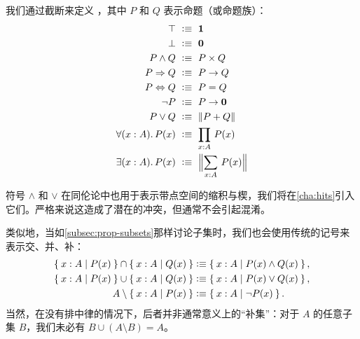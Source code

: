 \begin{defn} \label{defn:logical-notation}
  我们通过截断来定义
  ，其中 $P$ 和 $Q$ 表示命题（或命题族）：
  {\allowdisplaybreaks
  \begin{align*}
    \top            &\ \defeq \ \unit \\
    \bot            &\ \defeq \ \emptyt \\
    P \land Q       &\ \defeq \ P \times Q \\
    P \Rightarrow Q &\ \defeq \ P \to Q \\
    P \Leftrightarrow Q &\ \defeq \ P = Q \\
    \neg P          &\ \defeq \ P \to \emptyt \\
    P \lor Q        &\ \defeq \ \brck{P + Q} \\
    \fall{x : A} P(x) &\ \defeq \ \prd{x : A} P(x) \\
    \exis{x : A} P(x) &\ \defeq \ \Brck{\sm{x : A} P(x)}
  \end{align*}}
\end{defn}

符号 $\land$ 和 $\lor$ 在同伦论中也用于表示带点空间的缩积与楔，我们将在\cref{cha:hits}引入它们。严格来说这造成了潜在的冲突，但通常不会引起混淆。

类似地，当如\cref{subsec:prop-subsets}那样讨论子集时，我们也会使用传统的记号来表示交、并、补：
%
%
%
%
%
%
\begin{align*}
  \Set{x:A | P(x)} \cap \Set{x:A | Q(x)}
  &\vcentcolon\equiv \Set{x:A | P(x) \land Q(x)},\\
  \Set{x:A | P(x)} \cup \Set{x:A | Q(x)}
  &\vcentcolon\equiv \Set{x:A | P(x) \lor Q(x)},\\
  A \setminus \Set{x:A | P(x)}
  &\vcentcolon\equiv \Set{x:A | \neg P(x)}.
\end{align*}
当然，在没有排中律的情况下，后者并非通常意义上的``补集''：对于 $A$ 的任意子集 $B$，我们未必有 $B \cup (A\setminus B) = A$。

%
%
%

